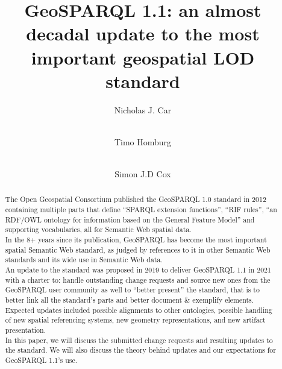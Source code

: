 \documentclass[runningheads]{llncs}
\begin{document}
\title{GeoSPARQL 1.1: an almost decadal update to the most important geospatial LOD standard}

\author{
    Nicholas J. Car \and \\
    Timo Homburg \and \\
    Simon J.D Cox
}



\maketitle

\begin{abstract}
The Open Geospatial Consortium published the GeoSPARQL 1.0 standard \cite{open2012ogc} in 2012 containing multiple 
parts that define ``SPARQL extension functions'', ``RIF rules''\cite{kifer2013rif}, ``an RDF/OWL ontology for 
information based on the General Feature Model'' and supporting vocabularies, all for Semantic 
Web spatial data.\\

In the 8+ years since its publication, GeoSPARQL has become the most important spatial Semantic 
Web standard, as judged by references to it in other Semantic Web standards and its wide use in 
Semantic Web data.\\

An update to the standard was proposed in 2019 to deliver GeoSPARQL 1.1 in 2021 with a charter\cite{abhayaratna2020ogc} to: 
handle outstanding change requests and source new ones from the GeoSPARQL user community as well 
to ``better present'' the standard, that is to better link all the standard’s parts and better 
document \& exemplify elements. Expected updates included possible alignments to other ontologies, 
possible handling of new spatial referencing systems, new geometry representations, and new artifact 
presentation.\\

In this paper, we will discuss the submitted change requests and resulting updates to the standard. 
We will also discuss the theory behind updates and our expectations for GeoSPARQL 1.1's use.

\end{abstract}
\end{document}

